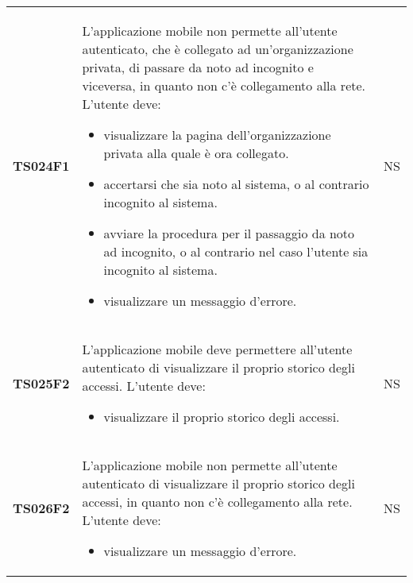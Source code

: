 \documentclass[../piano-di-qualifica.tex]{subfiles}
\begin{document}
\begin{longtable}[H]{>{\centering\bfseries}m{3cm} >{}m{10cm} >{\centering\arraybackslash}m{3cm}}
  TS024F1            & L'applicazione mobile non permette all'utente autenticato, che è collegato ad un'organizzazione privata, di passare da noto ad incognito e viceversa, in quanto non c'è collegamento alla rete. \newline
  L'utente deve:
  \begin{itemize}
    \item visualizzare la pagina dell'organizzazione privata alla quale è ora collegato.
    \item accertarsi che sia noto al sistema, o al contrario incognito al sistema.
    \item avviare la procedura per il passaggio da noto ad incognito, o al contrario nel caso l'utente sia incognito al sistema.
    \item visualizzare un messaggio d'errore.
  \end{itemize}
                     & NS                                                                                                                                                                                                                                                               \\
  TS025F2            & L'applicazione mobile deve permettere all'utente autenticato di visualizzare il proprio storico degli accessi. \newline
  L'utente deve:
  \begin{itemize}
    \item visualizzare il proprio storico degli accessi.
  \end{itemize}
                     & NS                                                                                                                                                                                                                                                               \\
  TS026F2            & L'applicazione mobile non permette all'utente autenticato di visualizzare il proprio storico degli accessi, in quanto non c'è collegamento alla rete. \newline
  L'utente deve:
  \begin{itemize}
    \item visualizzare un messaggio d'errore.
  \end{itemize}
                     & NS                                                                                                                                                                                                                                                               \\

\end{longtable}
\end{document}

